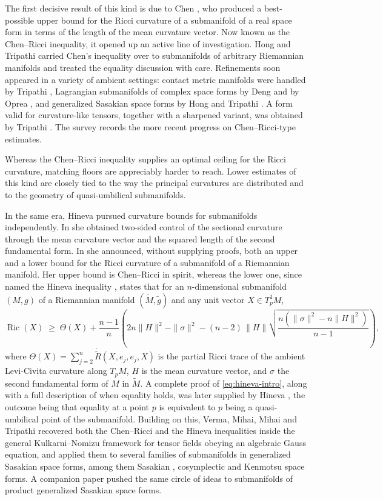 \documentclass[11pt]{article}
\theoremstyle{definition}
\newcommand{\tM}{\widetilde{M}}
\newcommand{\tg}{\widetilde{g}}
\newcommand{\ctR}{\mathring{\widetilde{R}}}
\newcommand{\Ric}{\operatorname{Ric}}
\begin{document}
The first decisive result of this kind is due to Chen \cite{Chen}, who produced a best-possible upper bound for the Ricci curvature of a submanifold of a real space form in terms of the length of the mean curvature vector. Now known as the Chen--Ricci inequality, it opened up an active line of investigation. Hong and Tripathi \cite{HT1} carried Chen's inequality over to submanifolds of arbitrary Riemannian manifolds and treated the equality discussion with care. Refinements soon appeared in a variety of ambient settings: contact metric manifolds were handled by Tripathi \cite{Tripathi1}, Lagrangian submanifolds of complex space forms by Deng \cite{Deng} and by Oprea \cite{Oprea1,Oprea2}, and generalized Sasakian space forms by Hong and Tripathi \cite{HT2}. A form valid for curvature-like tensors, together with a sharpened variant, was obtained by Tripathi \cite{Tripathi2}. The survey \cite{ChenBlaga} records the more recent progress on Chen--Ricci-type estimates.

Whereas the Chen--Ricci inequality supplies an optimal ceiling for the Ricci curvature, matching floors are appreciably harder to reach. Lower estimates of this kind are closely tied to the way the principal curvatures are distributed and to the geometry of quasi-umbilical submanifolds.

In the same era, Hineva pursued curvature bounds for submanifolds independently. In \cite{Hineva1} she obtained two-sided control of the sectional curvature through the mean curvature vector and the squared length of the second fundamental form. In \cite{Hineva2} she announced, without supplying proofs, both an upper and a lower bound for the Ricci curvature of a submanifold of a Riemannian manifold. Her upper bound is Chen--Ricci in spirit, whereas the lower one, since named the Hineva inequality \cite{Verma1}, states that for an $n$-dimensional submanifold $(M,g)$ of a Riemannian manifold $(\tM,\tg)$ and any unit vector $X\in T^1_pM$,
\begin{equation}\label{eq:hineva-intro}
\Ric(X)\;\ge\;\Theta(X)+\frac{n-1}{n}\left(2n\|H\|^2-\|\sigma\|^2-(n-2)\,\|H\|\sqrt{\frac{n\left(\|\sigma\|^2-n\|H\|^2\right)}{n-1}}\right),
\end{equation}
where $\Theta(X)=\sum_{j=2}^{n}\ctR(X,e_j,e_j,X)$ is the partial Ricci trace of the ambient Levi-Civita curvature along $T_pM$, $H$ is the mean curvature vector, and $\sigma$ the second fundamental form of $M$ in $\tM$. A complete proof of \eqref{eq:hineva-intro}, along with a full description of when equality holds, was later supplied by Hineva \cite{Hineva3}, the outcome being that equality at a point $p$ is equivalent to $p$ being a quasi-umbilical point of the submanifold. Building on this, Verma, Mihai, Mihai and Tripathi \cite{Verma1} recovered both the Chen--Ricci and the Hineva inequalities inside the general Kulkarni--Nomizu framework for tensor fields obeying an algebraic Gauss equation, and applied them to several families of submanifolds in generalized Sasakian space forms, among them Sasakian \cite{ABC}, cosymplectic and Kenmotsu space forms. A companion paper \cite{Verma2} pushed the same circle of ideas to submanifolds of product generalized Sasakian space forms.
\end{document}
